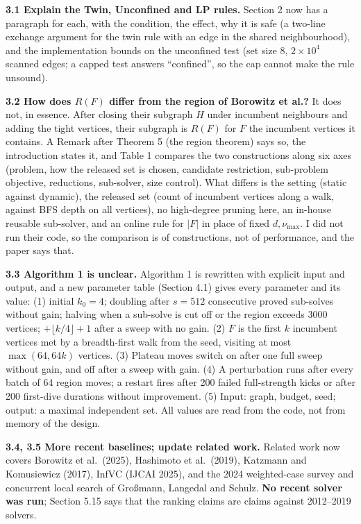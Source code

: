 \documentclass[11pt]{article}
\newcommand{\rev}[1]{\medskip\noindent\textbf{#1}}
\begin{document}
\rev{3.1 Explain the Twin, Unconfined and LP rules.}
Section 2 now has a paragraph for each, with the condition, the effect, why it is
safe (a two-line exchange argument for the twin rule with an edge in the shared
neighbourhood), and the implementation bounds on the unconfined test (set size 8,
$2\times10^4$ scanned edges; a capped test answers ``confined'', so the cap
cannot make the rule unsound).

\rev{3.2 How does $R(F)$ differ from the region of Borowitz et al.?}
It does not, in essence. After closing their subgraph $H$ under incumbent
neighbours and adding the tight vertices, their subgraph is $R(F)$ for $F$ the
incumbent vertices it contains. A Remark after Theorem 5 (the region theorem) says so, the
introduction states it, and Table 1 compares the two constructions along six
axes (problem, how the released set is chosen, candidate restriction,
sub-problem objective, reductions, sub-solver, size control). What differs is
the setting (static against dynamic), the released set (count of incumbent
vertices along a walk, against BFS depth on all vertices), no high-degree pruning
here, an in-house reusable sub-solver, and an online rule for $|F|$ in place of
fixed $d,\nu_{\max}$. I did not run their code, so the comparison is of
constructions, not of performance, and the paper says that.

\rev{3.3 Algorithm 1 is unclear.}
Algorithm 1 is rewritten with explicit input and output, and a new parameter table (Section 4.1)
gives every parameter and its value: (1) initial $k_0=4$; doubling after
$s=512$ consecutive proved sub-solves without gain; halving when a sub-solve is
cut off or the region exceeds 3000 vertices; $+\lfloor k/4\rfloor+1$ after a
sweep with no gain. (2) $F$ is the first $k$ incumbent vertices met by a
breadth-first walk from the seed, visiting at most $\max(64,64k)$ vertices.
(3) Plateau moves switch on after one full sweep without gain, and off after a
sweep with gain. (4) A perturbation runs after every batch of 64 region moves;
a restart fires after 200 failed full-strength kicks or after 200 first-dive
durations without improvement. (5) Input: graph, budget, seed; output: a
maximal independent set. All values are read from the code, not from memory of
the design.

\rev{3.4, 3.5 More recent baselines; update related work.}
Related work now covers Borowitz et al.\ (2025), Hashimoto et al.\ (2019),
Katzmann and Komusiewicz (2017), InfVC (IJCAI 2025), and the 2024 weighted-case
survey and concurrent local search of Gro{\ss}mann, Langedal and Schulz. \textbf{No
recent solver was run}; Section 5.15 says that the ranking claims are claims
against 2012--2019 solvers.
\end{document}
